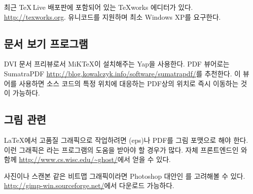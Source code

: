 최근 \TeX\,Live 배포판에 포함되어 있는 \TeX{}works 에디터가 있다. \url{http://texworks.org}.
유니코드를 지원하며 최소 Windows XP를 요구한다.

\subsection{문서 보기 프로그램}

DVI 문서 프리뷰로서 MiK\TeX 이 설치해주는 Yap을 사용한다.
PDF 뷰어로는 SumatraPDF \url{http://blog.kowalczyk.info/software/sumatrapdf/}를 추천한다.
이 뷰어를 사용하면 소스 코드의 특정 위치에 대응하는 PDF상의 위치로 즉시 이동하는 것이 가능하다.

\subsection{그림 관련}

\LaTeX 에서 고품질 그래픽으로 작업하려면 \EPSi{} (eps)나 PDF를 그림 포맷으로 해야 한다.
이런 그래픽은 라는 프로그램의 도움을 받아야 할 경우가 많다.
자체 프론트엔드인 와 함께 \url{http://www.cs.wisc.edu/~ghost/}에서 얻을 수 있다.

사진이나 스캔본 같은 비트맵 그래픽이라면 Photoshop 대안인 를 고려해볼 수 있다.
\url{http://gimp-win.sourceforge.net/}에서 다운로드 가능하다.

